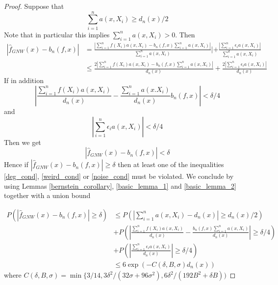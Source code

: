 \documentclass{article}
\begin{document}
\begin{proof}
Suppose that
\begin{equation}
\label{deg_cond}
    \sum_{i=1}^n a(x,X_i)\geq d_n(x)/2
\end{equation}
Note that in particular this implies $\sum_{i=1}^n a(x,X_i)>0$.
Then
\begin{equation}
\begin{split}
    |\hat{f}_{GNW}(x)-b_n(f,x)|&=\frac{|\sum_{i=1}^nf(X_i)a(x,X_i)-b_n(f,x)\sum_{i=1}^n a(x,X_i)|}{\sum_{i=1}^n a(x,X_i)}|+\frac{|\sum_{i=1}^n \epsilon_ia(x,X_i)|}{\sum_{i=1}^da(x,X_i)}\\
    &\leq \frac{2|\sum_{i=1}^nf(X_i)a(x,X_i)-b_n(f,x)\sum_{i=1}^n a(x,X_i)|}{d_n(x)}+\frac{2|\sum_{i=1}^n \epsilon_ia(x,X_i)|}{d_n(x)}
\end{split}
\end{equation}
If in addition
\begin{equation}
\label{weird_cond}
|\frac{\sum_{i=1}^nf(X_i)a(x,X_i)}{d_n(x)}-\frac{\sum_{i=1}^na(x.X_i)}{d_n(x)}b_n(f,x)|<\delta/4
\end{equation}
and
\begin{equation}
\label{noise_cond}
|\sum_{i=1}^n \epsilon_ia(x,X_i)|<\delta/4
\end{equation}
Then we get 
\begin{equation*}
|\hat{f}_{GNW}(x)-b_n(f,x)|<\delta
\end{equation*}
Hence if $|\hat{f}_{GNW}(x)-b_n(f,x)|\geq \delta$ then at least one of the inequalities \ref{deg_cond}, \ref{weird_cond} or \ref{noise_cond} must be violated. We conclude by using Lemmas \ref{bernstein_corollary}, \ref{basic_lemma_1} and \ref{basic_lemma_2} together with a union bound 

\begin{equation*}
\begin{split}
    P(|\hat{f}_{GNW}(x)-b_n(f,x)|\geq\delta)&\leq P(|\sum_{i=1}^n a(x,X_i)-d_n(x)|\geq d_n(x)/2)\\
    &+P(|\frac{\sum_{i=1}^nf(X_i)a(x,X_i)}{d_n(x)}-\frac{b_n(f,x)\sum_{i=1}^na(x,X_i)}{d_n(x)}|\geq \delta/4)\\
    &+P(|\frac{\sum_{i=1}^n \epsilon_i a(x,X_i)}{d_n(x)}|\geq \delta/4)\\
    &\leq 6\exp(-C(\delta,B,\sigma)d_n(x))
\end{split}
\end{equation*}
where $C(\delta,B,\sigma)=\min\{3/14,3\delta^2/(32\sigma+96\sigma^2),6\delta^2/(192B^2+\delta B))$

\end{proof}
\end{document}
